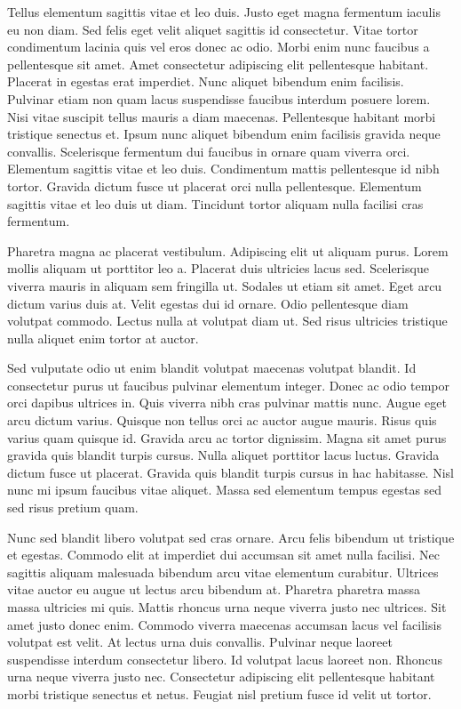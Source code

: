 \documentclass[11pt,a4paper]{article}
\begin{document}
Tellus elementum sagittis vitae et leo duis. Justo eget magna fermentum iaculis eu non diam. Sed felis eget velit aliquet sagittis id consectetur. Vitae tortor condimentum lacinia quis vel eros donec ac odio. Morbi enim nunc faucibus a pellentesque sit amet. Amet consectetur adipiscing elit pellentesque habitant. Placerat in egestas erat imperdiet. Nunc aliquet bibendum enim facilisis. Pulvinar etiam non quam lacus suspendisse faucibus interdum posuere lorem. Nisi vitae suscipit tellus mauris a diam maecenas. Pellentesque habitant morbi tristique senectus et. Ipsum nunc aliquet bibendum enim facilisis gravida neque convallis. Scelerisque fermentum dui faucibus in ornare quam viverra orci. Elementum sagittis vitae et leo duis. Condimentum mattis pellentesque id nibh tortor. Gravida dictum fusce ut placerat orci nulla pellentesque. Elementum sagittis vitae et leo duis ut diam. Tincidunt tortor aliquam nulla facilisi cras fermentum.

Pharetra magna ac placerat vestibulum. Adipiscing elit ut aliquam purus. Lorem mollis aliquam ut porttitor leo a. Placerat duis ultricies lacus sed. Scelerisque viverra mauris in aliquam sem fringilla ut. Sodales ut etiam sit amet. Eget arcu dictum varius duis at. Velit egestas dui id ornare. Odio pellentesque diam volutpat commodo. Lectus nulla at volutpat diam ut. Sed risus ultricies tristique nulla aliquet enim tortor at auctor.

Sed vulputate odio ut enim blandit volutpat maecenas volutpat blandit. Id consectetur purus ut faucibus pulvinar elementum integer. Donec ac odio tempor orci dapibus ultrices in. Quis viverra nibh cras pulvinar mattis nunc. Augue eget arcu dictum varius. Quisque non tellus orci ac auctor augue mauris. Risus quis varius quam quisque id. Gravida arcu ac tortor dignissim. Magna sit amet purus gravida quis blandit turpis cursus. Nulla aliquet porttitor lacus luctus. Gravida dictum fusce ut placerat. Gravida quis blandit turpis cursus in hac habitasse. Nisl nunc mi ipsum faucibus vitae aliquet. Massa sed elementum tempus egestas sed sed risus pretium quam.

Nunc sed blandit libero volutpat sed cras ornare. Arcu felis bibendum ut tristique et egestas. Commodo elit at imperdiet dui accumsan sit amet nulla facilisi. Nec sagittis aliquam malesuada bibendum arcu vitae elementum curabitur. Ultrices vitae auctor eu augue ut lectus arcu bibendum at. Pharetra pharetra massa massa ultricies mi quis. Mattis rhoncus urna neque viverra justo nec ultrices. Sit amet justo donec enim. Commodo viverra maecenas accumsan lacus vel facilisis volutpat est velit. At lectus urna duis convallis. Pulvinar neque laoreet suspendisse interdum consectetur libero. Id volutpat lacus laoreet non. Rhoncus urna neque viverra justo nec. Consectetur adipiscing elit pellentesque habitant morbi tristique senectus et netus. Feugiat nisl pretium fusce id velit ut tortor.
\end{document}
